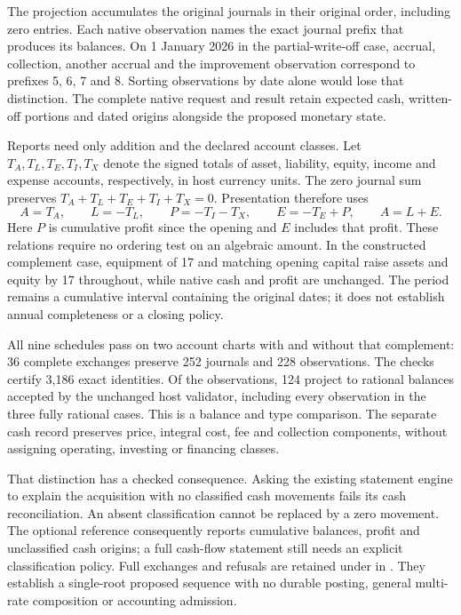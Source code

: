 The projection accumulates the original journals in their original order,
including zero entries. Each native observation names the exact journal prefix
that produces its balances. On 1 January 2026 in the partial-write-off case,
accrual, collection, another accrual and the improvement observation correspond
to prefixes 5, 6, 7 and 8. Sorting observations by date alone would lose that
distinction. The complete native request and result retain expected cash,
written-off portions and dated origins alongside the proposed monetary state.

Reports need only addition and the declared account classes. Let $T_A,T_L,T_E,
T_I,T_X$ denote the signed totals of asset, liability, equity, income and expense
accounts, respectively, in host currency units. The zero journal sum preserves
$T_A+T_L+T_E+T_I+T_X=0$. Presentation therefore uses
\[
 A=T_A,\qquad L=-T_L,\qquad
 P=-T_I-T_X,\qquad E=-T_E+P,\qquad A=L+E.
\]
Here $P$ is cumulative profit since the opening and $E$ includes that profit.
These relations require no ordering test on an algebraic amount. In the
constructed complement case, equipment of 17 and matching opening capital
raise assets and equity by 17 throughout, while native cash and profit are
unchanged. The period remains a cumulative interval containing the original
dates; it does not establish annual completeness or a closing policy.

All nine schedules pass on two account charts with and without that complement:
36 complete exchanges preserve 252 journals and 228 observations. The checks
certify 3,186 exact identities. Of the observations, 124 project to rational
balances accepted by the unchanged host validator, including every observation
in the three fully rational cases. This is a balance and type comparison.
The separate cash record preserves price, integral cost, fee and collection
components, without assigning operating, investing or financing classes.

That distinction has a checked consequence. Asking the existing statement
engine to explain the acquisition with no classified cash movements fails its
cash reconciliation. An absent classification cannot be replaced by a zero
movement. The optional reference consequently reports cumulative balances,
profit and unclassified cash origins; a full cash-flow statement still needs
an explicit classification policy. Full exchanges and refusals are retained
under {\small{}} in
{\small{}}. They establish a single-root
proposed sequence with no durable posting, general multi-rate composition or
accounting admission.



